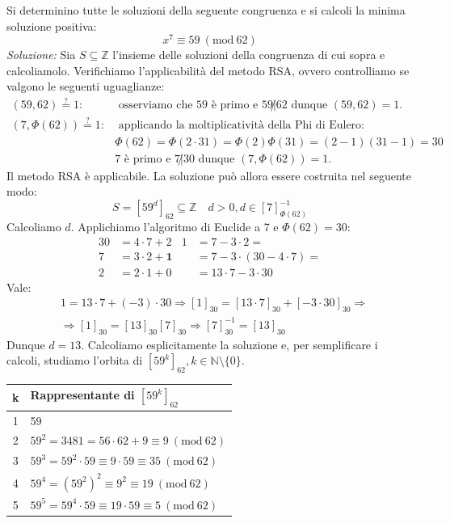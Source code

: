 \documentclass[oneside]{book}
\theoremstyle{remark}
\newcommand{\Mod}[1]{\ (\mathrm{mod}\ #1)} %
\newcommand{\head}[1]{\textnormal{\textbf{#1}}} %
\begin{document}
\begin{tcolorbox}[enhanced, breakable, colback=blue!30, colframe=blue!30!black, title=Esempio]
Si determinino tutte le soluzioni della seguente congruenza e si calcoli la
minima soluzione positiva:
\[ x^7\equiv59 \Mod{62} \]
\textit{Soluzione:} Sia $S\subseteq\mathbb{Z}$ l'insieme delle soluzioni della congruenza
di cui sopra e calcoliamolo. Verifichiamo l'applicabilità del metodo
RSA, ovvero controlliamo se valgono le seguenti uguaglianze:
\begin{align*}
(59,62)\stackrel{\text{?}}{=}1:      & \text{ osserviamo che 59 è primo
                                        e } 59\not|62 \text{ dunque
                                        } (59,62)=1.\\
(7,\Phi(62))\stackrel{\text{?}}{=}1: & \text{ applicando la moltiplicatività
                                        della Phi di Eulero: }\\
                                    &\Phi(62)=\Phi(2\cdot31)=\Phi(2)\Phi(31)=(2-1)(31-1)=30\\
                                    & \text{7 è primo e } 7\not|30 \text{ dunque } (7,\Phi(62))=1.
\end{align*}
Il metodo RSA è applicabile. La soluzione può allora essere costruita nel
seguente modo:
\[ S=[59^d]_{62}\subseteq\mathbb{Z} \quad d>0, d\in[7]^{-1}_{\Phi(62)} \]
Calcoliamo $d$. Applichiamo l'algoritmo di Euclide a 7 e $\Phi(62)=30$:
\begin{align*}
30 &=4\cdot7+2                & 1&=7-3\cdot2 =\\
7  &=3\cdot2+\textbf{1}       &  &=7-3\cdot(30-4\cdot7)=\\
2  &=2\cdot1+0                &  &=13\cdot7-3\cdot30
\end{align*}
Vale:
\begin{align*}
    &1=13\cdot7+(-3)\cdot30 \Longrightarrow [1]_{30}=[13\cdot7]_{30}+[-3\cdot30]_{30} \Longrightarrow\\
    &\Longrightarrow [1]_{30}=[13]_{30}[7]_{30} \Longrightarrow [7]^{-1}_{30}=[13]_{30}
\end{align*}
Dunque $d=13$. Calcoliamo esplicitamente la soluzione e, per semplificare i
calcoli, studiamo l'orbita di $[59^k]_{62}, k\in\mathbb{N}\setminus\{0\}$.

\begin{center}
\begin{tabular}{c|l}
    \head{k} & \head{Rappresentante di $[59^k]_{62}$}\\
    \hline
    1        & 59\\
    2        & $59^2=3481=56\cdot62+9\equiv9 \Mod{62}$\\
    3        & $59^3=59^2\cdot59\equiv9\cdot59\equiv 35\Mod{62}$\\
    4        & $59^4=(59^2)^2\equiv9^2\equiv 19 \Mod{62}$\\
    5        & $59^5=59^4\cdot59\equiv19\cdot59\equiv 5\Mod{62}$\\
\end{tabular}
\end{center}


\end{tcolorbox}
\end{document}
